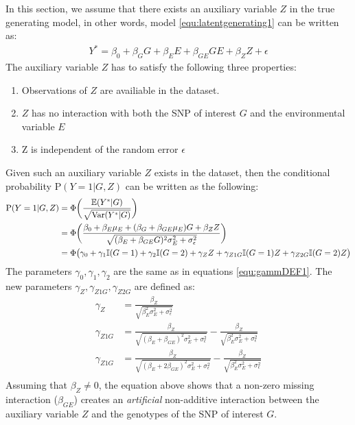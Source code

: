 In this section, we assume that there exists an auxiliary variable $Z$ in the true generating model, in other words, model \ref{equ:latentgenerating1} can be written as:
\begin{equation}\label{equ:latentaux}
\begin{aligned}
Y^* = \beta_0+\beta_GG + \beta_EE + \beta_{GE}GE + \beta_{Z}Z + \epsilon
\end{aligned}
\end{equation}
The auxiliary variable $Z$ has to satisfy the following three properties:
\begin{enumerate}\label{req:aux}
  \item Observations of $Z$ are availiable in the dataset.
  \item $Z$ has no interaction with both the SNP of interest $G$ and the environmental variable $E$
  \item Z is independent of the random error $\epsilon$
\end{enumerate}
Given such an auxiliary variable $Z$ exists in the dataset, then the conditional probability $\text{P}(Y=1|G,Z)$ can be written as the following:
\begin{equation}\label{equ:simModelAdditiveAux}
\begin{aligned}
\text{P}(Y=1|G,Z) &= \Phi\bigg(\frac{\mathbb{E}(Y^*|G)}{\sqrt{\text{Var}(Y^*|G)}}\bigg)\\
                  &= \Phi\bigg(\frac{\beta_0+ \beta_E \mu_E + (\beta_G +\beta_{GE}\mu_E)G + \beta_ZZ}{\sqrt{(\beta_E + \beta_{GE}G)^2 \sigma_E^2 + \sigma_\epsilon^2}}\bigg)\\
                  &= \Phi\big(\gamma_0 + \gamma_1 \mathbb{I}(G=1) + \gamma_2 \mathbb{I}(G=2) + \gamma_Z Z + \gamma_{Z1G}\mathbb{I}(G=1) Z + \gamma_{Z2G}\mathbb{I}(G=2) Z \big)
\end{aligned}
\end{equation}
The parameters $\gamma_0,\gamma_1,\gamma_2$ are the same as in equations \ref{equ:gammDEF1}. The new parameters $\gamma_{Z},\gamma_{Z1G},\gamma_{Z2G}$ are defined as:
\begin{equation}\label{equ:gammDEF2}
\begin{aligned}
\gamma_Z &= \frac{\beta_Z}{\sqrt{\beta_E^2 \sigma_E^2 + \sigma_\epsilon^2}}\\
\gamma_{Z1G} &= \frac{\beta_Z}{\sqrt{(\beta_E + \beta_{GE})^2 \sigma_E^2 + \sigma_\epsilon^2}} - \frac{\beta_Z}{\sqrt{\beta_E^2 \sigma_E^2 + \sigma_\epsilon^2}}\\
\gamma_{Z1G} &= \frac{\beta_Z}{\sqrt{(\beta_E + 2\beta_{GE})^2 \sigma_E^2 + \sigma_\epsilon^2}} - \frac{\beta_Z}{\sqrt{\beta_E^2 \sigma_E^2 + \sigma_\epsilon^2}}\\
\end{aligned}
\end{equation}
Assuming that $\beta_Z \neq 0$, the equation above shows that a non-zero missing interaction ($\beta_{GE}$) creates an \textit{artificial} non-additive interaction between the auxiliary variable $Z$ and the genotypes of the SNP of interest $G$.

